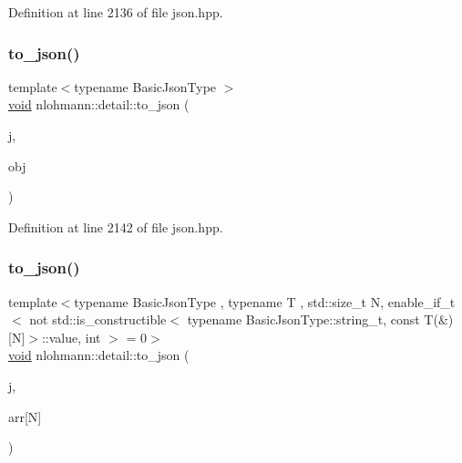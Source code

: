 Definition at line 2136 of file json.\+hpp.

\mbox{\label{namespacenlohmann_1_1detail_ac9f7a5542851c61d93740148eaec509f}} 
\subsubsection{\texorpdfstring{to\_json()}{to\_json()}\hspace{0.1cm}{\footnotesize\ttfamily [13/17]}}
{\footnotesize\ttfamily template$<$typename Basic\+Json\+Type $>$ \\
\mbox{\hyperlink{namespacenlohmann_1_1detail_a59fca69799f6b9e366710cb9043aa77d}{void}} nlohmann\+::detail\+::to\+\_\+json (\begin{DoxyParamCaption}\item[{Basic\+Json\+Type \&}]{j,  }\item[{typename Basic\+Json\+Type\+::object\+\_\+t \&\&}]{obj }\end{DoxyParamCaption})}



Definition at line 2142 of file json.\+hpp.

\mbox{\label{namespacenlohmann_1_1detail_a20ea5175c8999fc8b673e46b892f71f6}} 
\subsubsection{\texorpdfstring{to\_json()}{to\_json()}\hspace{0.1cm}{\footnotesize\ttfamily [14/17]}}
{\footnotesize\ttfamily template$<$typename Basic\+Json\+Type , typename T , std\+::size\+\_\+t N, enable\+\_\+if\+\_\+t$<$ not std\+::is\+\_\+constructible$<$ typename Basic\+Json\+Type\+::string\+\_\+t, const T(\&)\mbox{[}\+N\mbox{]}$>$\+::value, int $>$  = 0$>$ \\
\mbox{\hyperlink{namespacenlohmann_1_1detail_a59fca69799f6b9e366710cb9043aa77d}{void}} nlohmann\+::detail\+::to\+\_\+json (\begin{DoxyParamCaption}\item[{Basic\+Json\+Type \&}]{j,  }\item[{const T(\&)}]{arr\mbox{[}\+N\mbox{]} }\end{DoxyParamCaption})}



